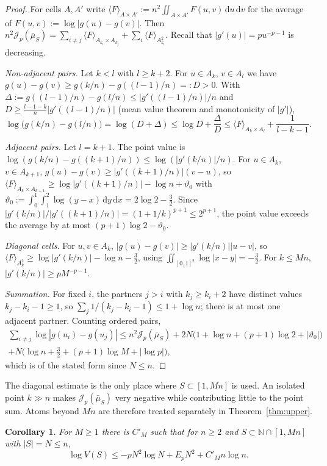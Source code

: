 \documentclass{amsart}
\newtheorem{corollary}[theorem]{Corollary}
\theoremstyle{definition}
\theoremstyle{remark}
\numberwithin{equation}{section}
\newcommand{\N}{\mathbb{N}}
\newcommand{\cJ}{\mathcal{J}}
\newcommand{\dd}{\,\mathrm{d}}
\begin{document}
\begin{proof}
For cells $A,A'$ write $\langle F\rangle_{A\times A'}:=n^2\iint_{A\times A'}F(u,v)\dd u\dd v$ for the average of
$F(u,v):=\log|g(u)-g(v)|$. Then
$n^2\cJ_p(\bar\mu_S)=\sum_{i\ne j}\langle F\rangle_{A_{k_i}\times A_{k_j}}+\sum_i\langle F\rangle_{A_{k_i}^2}$. Recall
that $|g'(u)|=pu^{-p-1}$ is decreasing.

\emph{Non-adjacent pairs.} Let $k<l$ with $l\ge k+2$. For $u\in A_k$, $v\in A_l$ we have
$g(u)-g(v)\ge g(k/n)-g((l-1)/n)=:D>0$. With $\Delta:=g((l-1)/n)-g(l/n)\le|g'((l-1)/n)|/n$ and
$D\ge\frac{l-1-k}{n}|g'((l-1)/n)|$ (mean value theorem and monotonicity of $|g'|$),
\[
  \log\bigl(g(k/n)-g(l/n)\bigr)=\log(D+\Delta)\le\log D+\frac\Delta D\le\langle F\rangle_{A_k\times A_l}+\frac1{l-k-1}.
\]

\emph{Adjacent pairs.} Let $l=k+1$. The point value is $\log(g(k/n)-g((k+1)/n))\le\log(|g'(k/n)|/n)$. For
$u\in A_k$, $v\in A_{k+1}$, $g(u)-g(v)\ge|g'((k+1)/n)|(v-u)$, so
$\langle F\rangle_{A_k\times A_{k+1}}\ge\log|g'((k+1)/n)|-\log n+\vartheta_0$ with
$\vartheta_0:=\int_0^1\int_1^2\log(y-x)\dd y\dd x=2\log2-\frac32$. Since $|g'(k/n)|/|g'((k+1)/n)|=(1+1/k)^{p+1}\le2^{p+1}$, the
point value exceeds the average by at most $(p+1)\log2-\vartheta_0$.

\emph{Diagonal cells.} For $u,v\in A_k$, $|g(u)-g(v)|\ge|g'(k/n)||u-v|$, so
$\langle F\rangle_{A_k^2}\ge\log|g'(k/n)|-\log n-\frac32$, using $\iint_{[0,1]^2}\log|x-y|=-\frac32$. For $k\le Mn$,
$|g'(k/n)|\ge pM^{-p-1}$.

\emph{Summation.} For fixed $i$, the partners $j>i$ with $k_j\ge k_i+2$ have distinct values $k_j-k_i-1\ge1$, so
$\sum_j1/(k_j-k_i-1)\le1+\log n$; there is at most one adjacent partner. Counting ordered pairs,
\begin{multline*}
  \sum_{i\ne j}\log|g(u_i)-g(u_j)|\le n^2\cJ_p(\bar\mu_S)+2N\bigl(1+\log n+(p+1)\log2+|\vartheta_0|\bigr)\\
  +N\bigl(\log n+\tfrac32+(p+1)\log M+|\log p|\bigr),
\end{multline*}
which is of the stated form since $N\le n$.
\end{proof}

The diagonal estimate is the only place where $S\subset[1,Mn]$ is used. An isolated point $k\gg n$ makes
$\cJ_p(\bar\mu_S)$ very negative while contributing little to the point sum. Atoms beyond $Mn$ are therefore treated
separately in Theorem~\ref{thm:upper}.

\begin{corollary}\label{cor:head}
For $M\ge1$ there is $C'_M$ such that for $n\ge2$ and $S\subset\N\cap[1,Mn]$ with $|S|=N\le n$,
\[
  \log V(S)\le-pN^2\log N+E_pN^2+C'_Mn\log n .
\]
\end{corollary}
\end{document}
